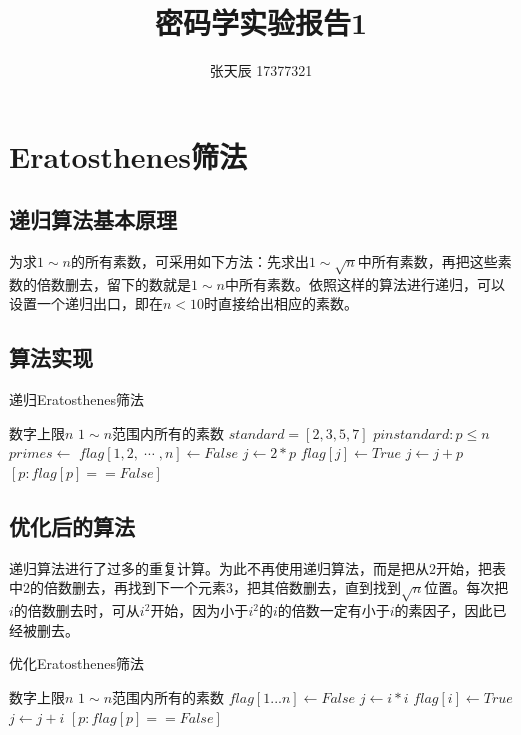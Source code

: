 \documentclass[11pt]{ctexart}
\title{密码学实验报告1}
\author{张天辰	17377321}
\begin{document}
\maketitle{}



\section{Eratosthenes筛法}
\subsection{递归算法基本原理}
为求$1 \sim n$的所有素数，可采用如下方法：先求出$1 \sim \sqrt n$中所有素数，再把这些素数的倍数删去，留下的数就是$1 \sim n$中所有素数。依照这样的算法进行递归，可以设置一个递归出口，即在$n < 10$时直接给出相应的素数。
\subsection{算法实现}
\begin{algorithm}  
    \caption{递归Eratosthenes筛法}  
    \begin{algorithmic}[1] %
        \Require 数字上限$n$  
        \Ensure $1 \sim n$范围内所有的素数  
            \State $standard = [2, 3, 5, 7]$
                \State \Return $p in standard: p \leqslant n$
            \Else
                \State $primes \gets $
                \State $flag[1, 2, \; \cdots \; ,n] \gets False$
                    \State $j \gets 2 * p$
                        \State $flag[j] \gets True$
                        \State $j \gets j + p$
                    \EndWhile
                \EndFor
                \State \Return $[p: flag[p] == False]$
            \EndIf
        \EndFunction  
    \end{algorithmic}  
\end{algorithm} 
\subsection{优化后的算法}
递归算法进行了过多的重复计算。为此不再使用递归算法，而是把从$2$开始，把表中$2$的倍数删去，再找到下一个元素$3$，把其倍数删去，直到找到$\sqrt n$位置。每次把$i$的倍数删去时，可从$i^2$开始，因为小于$i^2$的$i$的倍数一定有小于$i$的素因子，因此已经被删去。
\begin{algorithm}  
    \caption{优化Eratosthenes筛法}  
    \begin{algorithmic}[1] %
        \Require 数字上限$n$  
        \Ensure $1 \sim n$范围内所有的素数  
            \State $flag[1...n] \gets {False}$  
            		\State $j \gets i * i$
            			\State $flag[i] \gets {True}$
            			\State $j \gets j + i$
            		\EndWhile
            	\EndIf
            \EndFor
            \State \Return $[p: flag[p] == False]$
        \EndFunction  
    \end{algorithmic}  
\end{algorithm} 
\end{document}

